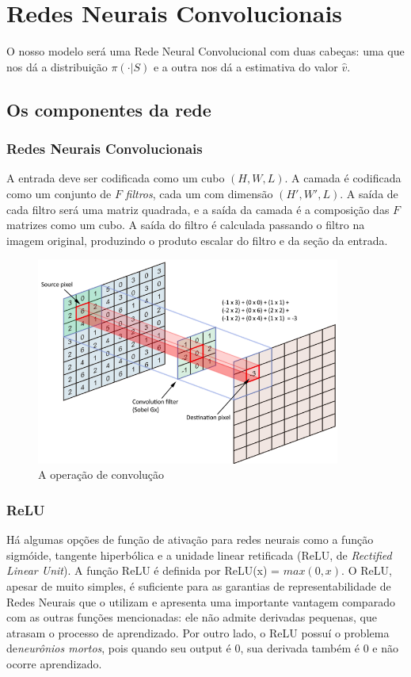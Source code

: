 \chapter{Redes Neurais Convolucionais}
\label{cap:modelo}

O nosso modelo será uma Rede Neural Convolucional com duas cabeças: uma que nos dá a distribuição $\pi(\cdot | S)$ e a outra nos dá a estimativa do valor $\hat{v}$.

\section{Os componentes da rede}

\subsection{Redes Neurais Convolucionais}

A entrada deve ser codificada como um cubo $(H, W, L)$.
A camada é codificada como um conjunto de $F$ \textit{filtros}, cada um com dimensão $(H', W', L)$.
A saída de cada filtro será uma matriz quadrada, e a saída da camada é a composição das $F$ matrizes como um cubo.
A saída do filtro é calculada passando o filtro na imagem original, produzindo o produto escalar do filtro e da seção da entrada.

\begin{figure}[h!]
\centering
    \includegraphics[width=10cm]{figuras/convolution.png}
    \caption{A operação de convolução}
    \label{fig:convolution}
\end{figure}

\subsection{ReLU}

Há algumas opções de função de ativação para redes neurais como a função sigmóide, tangente hiperbólica e a unidade linear retificada (ReLU, de \textit{Rectified Linear Unit}). A função ReLU é definida por ReLU(x) = $max(0, x)$. O ReLU, apesar de muito simples, é suficiente para as garantias de representabilidade de Redes Neurais que o utilizam e apresenta uma importante vantagem comparado com as outras funções mencionadas: ele não admite derivadas pequenas, que atrasam o processo de aprendizado. Por outro lado, o ReLU possuí o problema de\textit{neurônios mortos}, pois quando seu output é 0, sua derivada também é 0 e não ocorre aprendizado.

